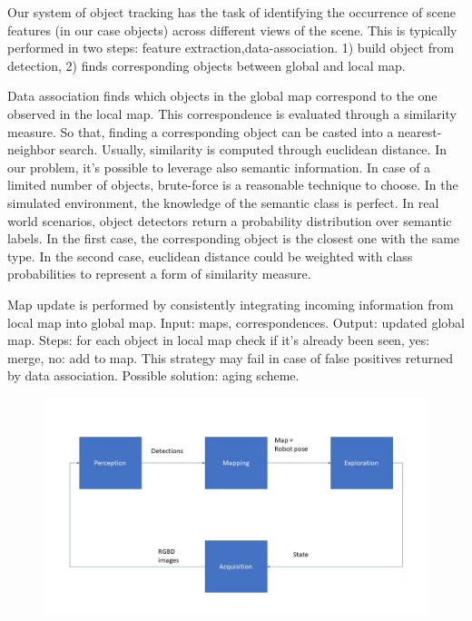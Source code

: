 \documentclass{article}
\begin{document}
	
	Our system of object tracking has the task of identifying the occurrence of scene features (in our case objects) across different views of the scene. This is typically performed in two steps: feature extraction,data-association. 1) build object from detection, 2) finds corresponding objects between global and local map.
	
	Data association finds which objects in the global map correspond to the one observed in the local map. This correspondence is evaluated through a similarity measure. So that, finding a corresponding object can be casted into a nearest-neighbor search. Usually, similarity is computed through euclidean distance. In our problem, it's possible to leverage also semantic information. In case of a limited number of objects, brute-force is a reasonable technique to choose. In the simulated environment, the knowledge of the semantic class is perfect. In real world scenarios, object detectors return a probability distribution over semantic labels. In the first case, the corresponding object is the closest one with the same type. In the second case, euclidean distance could be weighted with class probabilities to represent a form of similarity measure.
	
	Map update is performed by consistently integrating incoming information from local map into global map. Input: maps, correspondences. Output: updated global map. Steps: for each object in local map check if it's already been seen, yes: merge, no: add to map. This strategy may fail in case of false positives returned by data association. Possible solution:  aging scheme.
	
	 
    \begin{figure}[htbp]
		\centering
		\includegraphics[width=\linewidth]{pics/pipeline}
	\end{figure}	
	
	
	
	
	
\end{document}
